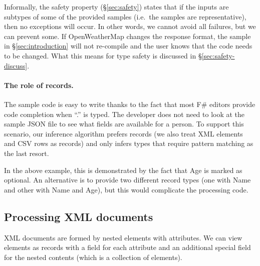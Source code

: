 \documentclass[10pt,preprint,blind,clearpagebib]{sigplanconf}
\newcommand{\ident}[1]{\textnormal{\sffamily #1}}
\begin{document}
Informally, the safety property (\S\ref{sec:safety}) states that if the inputs
are subtypes of some of the provided samples (i.e.~the samples are representative), then
no exceptions will occur. In other words, we cannot avoid all failures, but we can prevent some.
If OpenWeatherMap changes the response format, the sample in \S\ref{sec:introduction}
will not re-compile and the user knows that the code needs to be changed. What this means for
type safety is discussed in \S\ref{sec:safety-discuss}.

\paragraph{The role of records.}
The sample code is easy to write thanks to the fact that most F\# editors provide code completion
when ``.'' is typed. The developer does not need to look at the sample JSON file to see what fields
are available for a person. To support this scenario, our inference algorithm prefers records 
(we also treat XML elements and CSV rows as records) and only infers types that require pattern 
matching as the last resort.

In the above example, this is demonstrated by the fact that \ident{Age} is marked as optional.
An alternative is to provide two different record types (one with \ident{Name} and other with 
\ident{Name} and \ident{Age}), but this would complicate the processing code.


\subsection{Processing XML documents}
\label{sec:providers-xml}

XML documents are formed by nested elements with attributes. We can view elements as records with 
a field for each attribute and an additional special field for the nested contents (which is a 
collection of elements).
\end{document}
